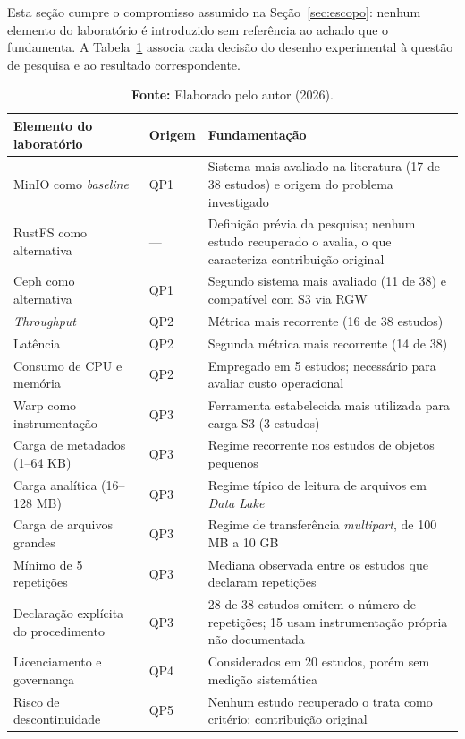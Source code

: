 Esta seção cumpre o compromisso assumido na Seção~\ref{sec:escopo}: nenhum
elemento do laboratório é introduzido sem referência ao achado que o fundamenta.
A Tabela~\ref{tab:derivacao} associa cada decisão do desenho experimental à
questão de pesquisa e ao resultado correspondente.

\begin{table}[htb]
\centering
\footnotesize
\caption{Derivação dos elementos do laboratório a partir dos achados do mapeamento.}
\label{tab:derivacao}
\begin{tabular}{@{}llp{6.2cm}@{}}
\toprule
\textbf{Elemento do laboratório} & \textbf{Origem} & \textbf{Fundamentação} \\
\midrule
MinIO como \textit{baseline}
  & QP1 & Sistema mais avaliado na literatura (17 de 38 estudos) e origem do
          problema investigado \\[2pt]
RustFS como alternativa
  & --- & Definição prévia da pesquisa; nenhum estudo recuperado o avalia, o que
          caracteriza contribuição original \\[2pt]
Ceph como alternativa
  & QP1 & Segundo sistema mais avaliado (11 de 38) e compatível com S3 via RGW \\[2pt]
\textit{Throughput}
  & QP2 & Métrica mais recorrente (16 de 38 estudos) \\[2pt]
Latência
  & QP2 & Segunda métrica mais recorrente (14 de 38) \\[2pt]
Consumo de CPU e memória
  & QP2 & Empregado em 5 estudos; necessário para avaliar custo operacional \\[2pt]
Warp como instrumentação
  & QP3 & Ferramenta estabelecida mais utilizada para carga S3 (3 estudos) \\[2pt]
Carga de metadados (1--64 KB)
  & QP3 & Regime recorrente nos estudos de objetos pequenos \\[2pt]
Carga analítica (16--128 MB)
  & QP3 & Regime típico de leitura de arquivos em \textit{Data Lake} \\[2pt]
Carga de arquivos grandes
  & QP3 & Regime de transferência \textit{multipart}, de 100 MB a 10 GB \\[2pt]
Mínimo de 5 repetições
  & QP3 & Mediana observada entre os estudos que declaram repetições \\[2pt]
Declaração explícita do procedimento
  & QP3 & 28 de 38 estudos omitem o número de repetições; 15 usam instrumentação
          própria não documentada \\[2pt]
Licenciamento e governança
  & QP4 & Considerados em 20 estudos, porém sem medição sistemática \\[2pt]
Risco de descontinuidade
  & QP5 & Nenhum estudo recuperado o trata como critério; contribuição original \\
\bottomrule
\end{tabular}
\caption*{\textbf{Fonte:} Elaborado pelo autor (2026).}
\end{table}

